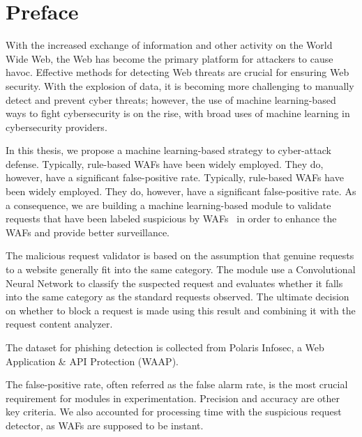 \chapter*{Preface}
\thispagestyle{fancy}
\label{tom_tat}
\hspace*{5cm}

With the increased exchange of information and other activity on the World Wide Web, the Web has become the primary platform for attackers to cause havoc. Effective methods for detecting Web threats are crucial for ensuring Web security. With the explosion of data, it is becoming more challenging to manually detect and prevent cyber threats; however, the use of machine learning-based ways to fight cybersecurity is on the rise, with broad uses of machine learning in cybersecurity providers. 

In this thesis, we propose a machine learning-based strategy to cyber-attack defense. Typically, rule-based WAFs have been widely employed. They do, however, have a significant false-positive rate. Typically, rule-based WAFs have been widely employed. They do, however, have a significant false-positive rate. As a consequence, we are building a machine learning-based module to validate requests that have been labeled suspicious by WAFs  in order to enhance the WAFs and provide better surveillance. 

The malicious request validator is based on the assumption that genuine requests to a website generally fit into the same category. The module use a Convolutional Neural Network to classify the suspected request and evaluates whether it falls into the same category as the standard requests observed. The ultimate decision on whether to block a request is made using this result and combining it with the request content analyzer.

The dataset for phishing detection is collected from Polaris Infosec, a Web Application \& API Protection (WAAP).

The false-positive rate, often referred as the false alarm rate, is the most crucial requirement for modules in experimentation. Precision and accuracy are other key criteria. We also accounted for processing time with the suspicious request detector, as WAFs are supposed to be instant.
	
\cleardoublepage